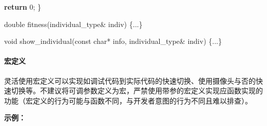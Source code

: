\documentclass[
]{article}
\newenvironment{Shaded}{}{}
\newcommand{\AttributeTok}[1]{\textcolor[rgb]{0.49,0.56,0.16}{#1}}
\newcommand{\ControlFlowTok}[1]{\textcolor[rgb]{0.00,0.44,0.13}{\textbf{#1}}}
\newcommand{\DataTypeTok}[1]{\textcolor[rgb]{0.56,0.13,0.00}{#1}}
\newcommand{\DecValTok}[1]{\textcolor[rgb]{0.25,0.63,0.44}{#1}}
\newcommand{\NormalTok}[1]{#1}
\newcommand{\OperatorTok}[1]{\textcolor[rgb]{0.40,0.40,0.40}{#1}}
\begin{document}
\begin{Shaded}
\begin{Highlighting}[]
	\ControlFlowTok{return} \DecValTok{0}\OperatorTok{;}
\OperatorTok{\}}

\DataTypeTok{double}\NormalTok{ fitness}\OperatorTok{(}\DataTypeTok{individual\_type}\OperatorTok{\&}\NormalTok{ indiv}\OperatorTok{)} \OperatorTok{\{...\}}

\DataTypeTok{void}\NormalTok{ show\_individual}\OperatorTok{(}\AttributeTok{const} \DataTypeTok{char}\OperatorTok{*}\NormalTok{ info}\OperatorTok{,} \DataTypeTok{individual\_type}\OperatorTok{\&}\NormalTok{ indiv}\OperatorTok{)} \OperatorTok{\{...\}}
\end{Highlighting}
\end{Shaded}

\hypertarget{ux5b8fux5b9aux4e49}{%
\paragraph{宏定义}\label{ux5b8fux5b9aux4e49}}

灵活使用宏定义可以实现如调试代码到实际代码的快速切换、使用摄像头与否的快速切换等。不建议将可调参数定义为宏，严禁使用带参的宏定义实现应函数实现的功能（宏定义的行为可能与函数不同，与开发者意图的行为不同且难以排查）。

\textbf{示例：}
\end{document}

